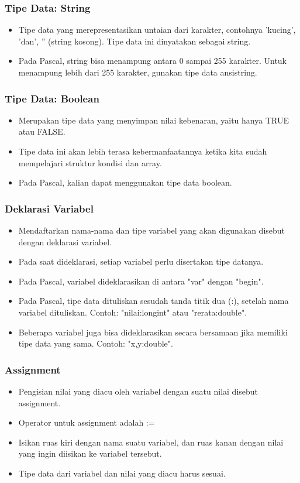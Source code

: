 \documentclass{beamer}
\begin{document}
\begin{frame}
\frametitle{Tipe Data: String}
\begin{itemize}
	\item Tipe data yang merepresentasikan untaian dari karakter, contohnya 'kucing', 'dan', '' (string kosong). Tipe data ini dinyatakan sebagai \alert{string}.
	\item Pada Pascal, string bisa menampung antara 0 sampai 255 karakter. Untuk menampung lebih dari 255 karakter, gunakan tipe data \alert{ansistring}.
\end{itemize}
\end{frame}

\begin{frame}
\frametitle{Tipe Data: Boolean}
\begin{itemize}
	\item Merupakan tipe data yang menyimpan nilai kebenaran, yaitu hanya TRUE atau FALSE.
	\item Tipe data ini akan lebih terasa kebermanfaatannya ketika kita sudah mempelajari struktur kondisi dan array.
	\item Pada Pascal, kalian dapat menggunakan tipe data \alert{boolean}.
\end{itemize}
\end{frame}


\begin{frame}
\frametitle{Deklarasi Variabel}
\begin{itemize}
	\item Mendaftarkan nama-nama dan tipe variabel yang akan digunakan disebut dengan deklarasi variabel.
	\item Pada saat dideklarasi, setiap variabel perlu disertakan tipe datanya. 
	\item Pada Pascal, variabel dideklarasikan di antara "var" dengan "begin".
	\item Pada Pascal, tipe data dituliskan sesudah tanda titik dua (:), setelah nama variabel dituliskan. Contoh: "nilai:longint" atau "rerata:double".
	\item Beberapa variabel juga bisa dideklarasikan secara bersamaan jika memiliki tipe data yang sama. Contoh: "x,y:double".
\end{itemize}
\end{frame}

\begin{frame}
\frametitle{Assignment}
\begin{itemize}
	\item Pengisian nilai yang diacu oleh variabel dengan suatu nilai disebut \alert{assignment}.
	\item Operator untuk assignment adalah :=
	\item Isikan ruas kiri dengan nama suatu variabel, dan ruas kanan dengan nilai yang ingin diisikan ke variabel tersebut.
	\item Tipe data dari variabel dan nilai yang diacu \alert{harus sesuai}.
\end{itemize}
\end{frame}
\end{document}
